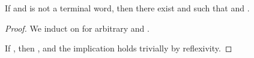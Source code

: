 \begin{isabellebody}
\begin{isamarkuptext}
\begin{lemma}\label{derivern_non_word_imp_hd_eps_reachable}
If  and  is not a terminal word, then there exist
 and  such that \mbox{} and 
.
\begin{proof}
We induct on  for arbitrary  and \isa{{\isasymgamma}}.

If , then , and the implication holds trivially by reflexivity.


\end{proof}
\end{lemma}
\end{isamarkuptext}
\end{isabellebody}
